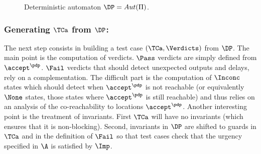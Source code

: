 \documentclass{LMCS}
\theoremstyle{plain}\newtheorem{proposition}[thm]{Proposition}
\begin{document}
\begin{figure}[htbp]
\begin{center}
{}
\end{center}
\caption{Deterministic automaton $\DP=Aut(\Pi)$.}
\label{fig:dp}
\end{figure}


\subsubsection*{Generating  $\TCa$ from $\DP$:}
The next step consists in building a test case $(\TCa,\Verdicts)$ from $\DP$.
The main point is the computation of verdicts.
$\Pass$  verdicts are simply defined from $\accept^\pdp$.
$\Fail$ verdicts that should detect unexpected outputs and delays, 
rely on a complementation. The difficult part is the computation of  
$\Inconc$ states
which should detect when $\accept^\pdp$ is not reachable 
(or equivalently 
$\None$ states, those states where $\accept^\pdp$ is still reachable)
and thus relies on an analysis of the co-reachability to locations $\accept^\pdp$.
Another interesting point is the treatment of invariants.
First $\TCa$ will have no invariants 
(which ensures that it is non-blocking).
Second, invariants in $\DP$ 
are shifted to guards in $\TCa$ and
in the definition of $\Fail$
so that 
test cases check that  the urgency specified in $\A$ is satisfied by $\Imp$.
\end{document}

